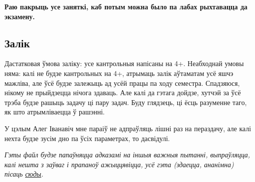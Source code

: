 	\textbf{Раю пакрыць усе заняткі, каб потым можна было па лабах рыхтавацца да экзамену.}
	
	\subsection{Залік}

	Дастатковая ўмова заліку: усе кантрольныя напісаны на 4+. Неабходнай умовы няма: калі не будзе кантрольных на 4+, атрымаць залік аўтаматам усё яшчэ мажліва, але ўсё будзе залежыць ад усёй працы па ходу семестра. Спадзяюся, нікому не прыйдзецца нічога здаваць. Але калі да гэтага дойдзе, хутчэй за ўсё трэба будзе рашыць задачу ці пару задач. Буду глядзець, ці ёсць разуменне таго, як што атрымліваецца ў рашэнні. 

	У цэлым Алег Іванавіч мне параіў не адпраўляць лішні раз на пераздачу, але калі нехта будзе зусім дно па ўсіх параметрах, то дасвідулі.

	\textit{Гэты файл будзе папаўняцца адказамі на іншыя важныя пытанні, выпраўляцца, калі нешта з заўваг і прапаноў ажыццявіцца, усё гэта (здаецца, ананімна) пісаць \href{https://docs.google.com/document/d/1La38_lqT7PtdRVmlvKIVh_7rIWvHqPBFG7yrWFoKkFM/edit?usp=sharing}{сюды}.}
